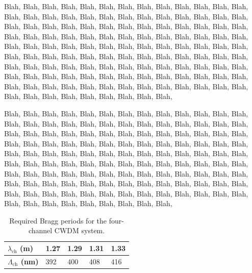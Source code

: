 \documentclass[lettersize,journal]{IEEEtran}
\begin{document}
    
    Blah, Blah, Blah, Blah, Blah, Blah, Blah, Blah, Blah, Blah, Blah, Blah, Blah, Blah, Blah, Blah, Blah, Blah, 
    Blah, Blah, Blah, Blah, Blah, Blah, Blah, Blah, Blah, Blah, Blah, Blah, Blah, Blah, Blah, Blah, Blah, Blah, 
    Blah, Blah, Blah, Blah, Blah, Blah, Blah, Blah, Blah, Blah, Blah, Blah, Blah, Blah, Blah, Blah, Blah, Blah, 
    Blah, Blah, Blah, Blah, Blah, Blah, Blah, Blah, Blah, Blah, Blah, Blah, Blah, Blah, Blah, Blah, Blah, Blah, 
    Blah, Blah, Blah, Blah, Blah, Blah, Blah, Blah, Blah, Blah, Blah, Blah, Blah, Blah, Blah, Blah, Blah, Blah, 
    Blah, Blah, Blah, Blah, Blah, Blah, Blah, Blah, Blah, Blah, Blah, Blah, Blah, Blah, Blah, Blah, Blah, Blah, 
    Blah, Blah, Blah, Blah, Blah, Blah, Blah, Blah, Blah, Blah, Blah, Blah, Blah, Blah, Blah, Blah, Blah, Blah, 
    
    Blah, Blah, Blah, Blah, Blah, Blah, Blah, Blah, Blah, Blah, Blah, Blah, Blah, Blah, Blah, Blah, Blah, Blah, 
    Blah, Blah, Blah, Blah, Blah, Blah, Blah, Blah, Blah, Blah, Blah, Blah, Blah, Blah, Blah, Blah, Blah, Blah, 
    Blah, Blah, Blah, Blah, Blah, Blah, Blah, Blah, Blah, Blah, Blah, Blah, Blah, Blah, Blah, Blah, Blah, Blah, 
    Blah, Blah, Blah, Blah, Blah, Blah, Blah, Blah, Blah, Blah, Blah, Blah, Blah, Blah, Blah, Blah, Blah, Blah, 
    Blah, Blah, Blah, Blah, Blah, Blah, Blah, Blah, Blah, Blah, Blah, Blah, Blah, Blah, Blah, Blah, Blah, Blah, 
    Blah, Blah, Blah, Blah, Blah, Blah, Blah, Blah, Blah, Blah, Blah, Blah, Blah, Blah, Blah, Blah, Blah, Blah, 
    Blah, Blah, Blah, Blah, Blah, Blah, Blah, Blah, Blah, Blah, Blah, Blah, Blah, Blah, Blah, Blah, Blah, Blah, 
    \begin{table}[!t]
		\caption{\label{tab:one}
		Required Bragg periods for the four-channel CWDM system.}
		\centering
		\begin{tabular}{|M{0.75in}|M{0.3in}|M{0.3in}|M{0.3in}|M{0.3in}|}	\hline %
			\textbf{$\lambda_\text{ch}$ (\textmu m)} & 1.27 & 1.29 & 1.31 & 1.33 \\ \hline
            \textbf{$\Lambda_\text{ch}$ (nm)} & 392 & 400 & 408 & 416\\ \hline
		\end{tabular}
	\end{table}
\end{document}
